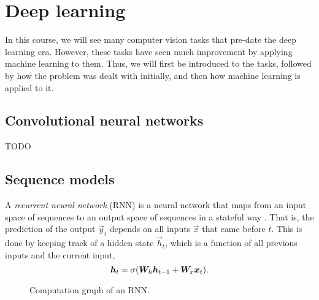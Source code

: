 \section{Deep learning}

In this course, we will see many computer vision tasks that pre-date the deep
learning era. However, these tasks have seen much improvement by applying
machine learning to them. Thus, we will first be introduced to the tasks,
followed by how the problem was dealt with initially, and then how machine
learning is applied to it.

\subsection{Convolutional neural networks}

TODO

\subsection{Sequence models}


A \textit{recurrent neural network} (RNN) is a neural network that maps from an
input space of sequences to an output space of sequences in a stateful way
\citep{rumelhart1985learning}. That is, the prediction of the output
$\vec{y}_t$ depends on all inputs $\vec{x}$ that came before $t$. This is done
by keeping track of a hidden state $\vec{h}_t$, which is a function of all
previous inputs and the current input, \[
  \bm{h}_t = \sigma(\bm{W}_h\bm{h}_{t-1}+\bm{W}_x\bm{x}_t)
.\]

\begin{figure}
  \centering
  \caption{Computation graph of an RNN.}
  \label{fig:rnn}
\end{figure}

